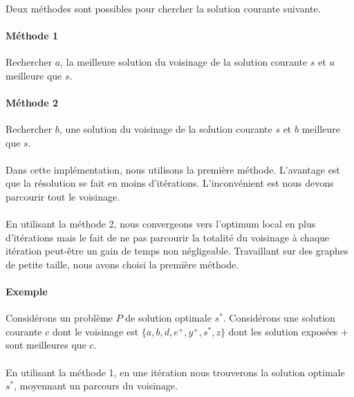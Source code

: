\documentclass[12pt]{article}
\begin{document}
\paragraph{}Deux méthodes sont possibles pour chercher la solution courante suivante.

\paragraph{Méthode 1}Rechercher $a$, la meilleure solution du voisinage de la solution courante $s$ et $a$ meilleure que $s$.

\paragraph{Méthode 2}Rechercher $b$, une solution du voisinage de la solution courante $s$ et $b$ meilleure que $s$.

\paragraph{}Dans cette implémentation, nous utilisons la première méthode.
L'avantage est que la résolution se fait en moins d'itérations. L'inconvénient est nous devons parcourir tout le voisinage.

\paragraph{}En utilisant la méthode 2, nous convergeons vers l'optimum local en plus d'itérations mais le fait de ne pas parcourir la totalité du voisinage à chaque itération peut-être un gain de temps non négligeable.
Travaillant sur des graphes de petite taille, nous avons choisi la première méthode.

\paragraph{Exemple} Considérons un problème $P$ de solution optimale $s^*$. Considérons une solution courante $c$ dont le voisinage est $\{a, b, d, e^+, y^+, s^*, z\}$ dont les solution exposées $+$ sont meilleures que $c$.

\paragraph{} En utilisant la méthode 1, en une itération nous trouverons la solution optimale $s^*$, moyennant un parcours du voisinage.
\end{document}
